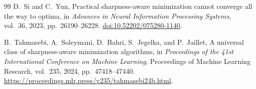 \documentclass[11pt]{article}
\theoremstyle{remark}
\begin{document}
\begin{thebibliography}{99}
D.~Si and C.~Yun,
Practical sharpness-aware minimization cannot converge all the way to
optima,
in \emph{Advances in Neural Information Processing Systems},
vol.~36, 2023, pp.~26190--26228.
\href{https://doi.org/10.52202/075280-1140}
{doi:10.52202/075280-1140}.

B.~Tahmasebi, A.~Soleymani, D.~Bahri, S.~Jegelka, and P.~Jaillet,
A universal class of sharpness-aware minimization algorithms,
in \emph{Proceedings of the 41st International Conference on Machine
Learning}, Proceedings of Machine Learning Research, vol.~235, 2024,
pp.~47418--47440.
\url{https://proceedings.mlr.press/v235/tahmasebi24b.html}.

\end{thebibliography}
\end{document}
